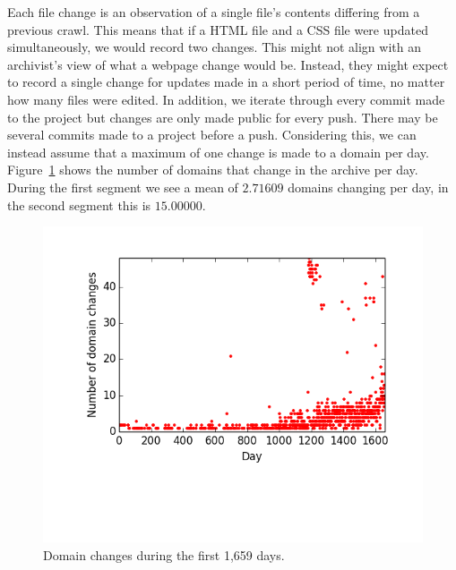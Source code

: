 \documentclass[11pt, twocolumn]{article}
\def \iostarted {1,659}
\def \meandomainchangesfirst {2.71609}
\def \meandomainchangeslast {15.00000}
\begin{document}
    Each file change is an observation of a single file's contents differing from a previous crawl. This means that if a HTML file and a CSS file were updated simultaneously, we would record two changes. This might not align with an archivist's view of what a webpage change would be. Instead, they might expect to record a single change for updates made in a short period of time, no matter how many files were edited. In addition, we iterate through every commit made to the project but changes are only made public for every push. There may be several commits made to a project before a push. Considering this, we can instead assume that a maximum of one change is made to a domain per day. Figure~\ref{fig:domain_changes_per_day:a} shows the number of domains that change in the archive per day. During the first segment we see a mean of $\meandomainchangesfirst$ domains changing per day, in the second segment this is $\meandomainchangeslast$.

    \begin{figure}
      \centering
      \includegraphics[width=\linewidth]{images/domain_changes_per_day_first.png}
      \caption{Domain changes during the first \iostarted{} days.}
      \label{fig:domain_changes_per_day:a}
    \end{figure}
\end{document}
